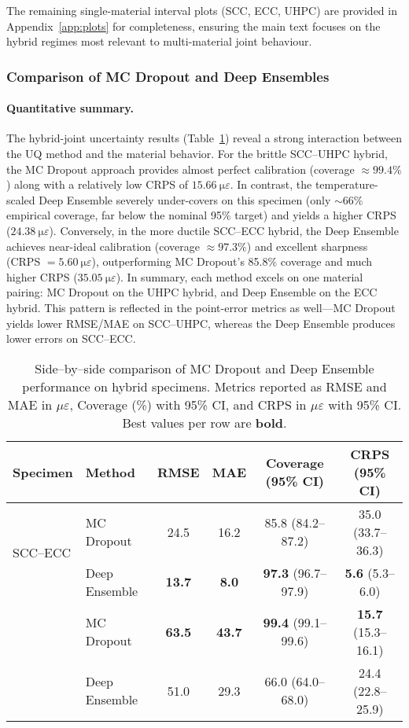 \documentclass{article}
\begin{document}
\noindent The remaining single-material interval plots (SCC, ECC, UHPC) are provided in Appendix~\ref{app:plots} for completeness, ensuring the main text focuses on the hybrid regimes most relevant to multi-material joint behaviour.


\subsubsection{Comparison of MC Dropout and Deep Ensembles}
\label{sec:compare-uq}

\paragraph{Quantitative summary.} The hybrid-joint uncertainty results (Table~\ref{tab:uq_comparison_summary}) reveal a strong interaction between the UQ method and the material behavior. For the brittle SCC–UHPC hybrid, the MC Dropout approach provides almost perfect calibration (coverage $\approx 99.4\%$) along with a relatively low CRPS of $\SI{15.66}{\micro\varepsilon}$. In contrast, the temperature-scaled Deep Ensemble severely under-covers on this specimen (only $\sim\!66\%$ empirical coverage, far below the nominal 95\% target) and yields a higher CRPS ($\SI{24.38}{\micro\varepsilon}$). Conversely, in the more ductile SCC–ECC hybrid, the Deep Ensemble achieves near-ideal calibration (coverage $\approx 97.3\%$) and excellent sharpness (CRPS $=\SI{5.60}{\micro\varepsilon}$), outperforming MC Dropout’s 85.8\% coverage and much higher CRPS ($\SI{35.05}{\micro\varepsilon}$). In summary, each method excels on one material pairing: MC Dropout on the UHPC hybrid, and Deep Ensemble on the ECC hybrid. This pattern is reflected in the point-error metrics as well—MC Dropout yields lower RMSE/MAE on SCC–UHPC, whereas the Deep Ensemble produces lower errors on SCC–ECC.

\begin{table}[h!]
\centering
\caption{Side--by--side comparison of MC Dropout and Deep Ensemble performance on hybrid specimens. Metrics reported as RMSE and MAE in $\mu\varepsilon$, Coverage (\%) with 95\% CI, and CRPS in $\mu\varepsilon$ with 95\% CI. Best values per row are \textbf{bold}.}
\label{tab:uq_comparison_summary}
\begin{tabular}{llcccc}
\toprule
\textbf{Specimen} & \textbf{Method} & \textbf{RMSE} & \textbf{MAE} & \textbf{Coverage (95\% CI)} & \textbf{CRPS (95\% CI)} \\
\midrule
\multirow{2}{*}{SCC--ECC} 
& MC Dropout    & 24.5 & 16.2 & 85.8 (84.2--87.2) & 35.0 (33.7--36.3) \\
& Deep Ensemble & \textbf{13.7} & \textbf{8.0}  & \textbf{97.3} (96.7--97.9) & \textbf{5.6} (5.3--6.0) \\
\addlinespace
\multirow{2}{*}{SCC--UHPC} 
& MC Dropout    & \textbf{63.5} & \textbf{43.7} & \textbf{99.4} (99.1--99.6) & \textbf{15.7} (15.3--16.1) \\
& Deep Ensemble & 51.0 & 29.3 & 66.0 (64.0--68.0) & 24.4 (22.8--25.9) \\
\bottomrule
\end{tabular}
\end{table}
\end{document}
